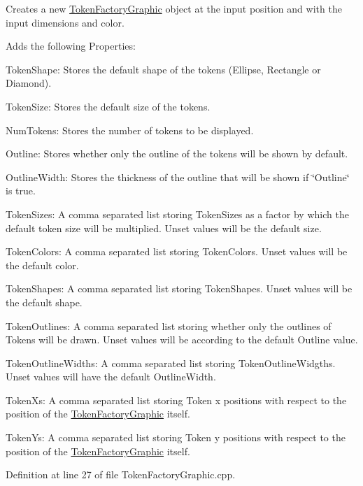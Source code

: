 Creates a new \hyperlink{class_picto_1_1_token_factory_graphic}{Token\-Factory\-Graphic} object at the input position and with the input dimensions and color. 

Adds the following Properties\-:
\begin{DoxyItemize}
\item Token\-Shape\-: Stores the default shape of the tokens (Ellipse, Rectangle or Diamond).
\item Token\-Size\-: Stores the default size of the tokens.
\item Num\-Tokens\-: Stores the number of tokens to be displayed.
\item Outline\-: Stores whether only the outline of the tokens will be shown by default.
\item Outline\-Width\-: Stores the thickness of the outline that will be shown if \char`\"{}\-Outline\char`\"{} is true.
\item Token\-Sizes\-: A comma separated list storing Token\-Sizes as a factor by which the default token size will be multiplied. Unset values will be the default size.
\item Token\-Colors\-: A comma separated list storing Token\-Colors. Unset values will be the default color.
\item Token\-Shapes\-: A comma separated list storing Token\-Shapes. Unset values will be the default shape.
\item Token\-Outlines\-: A comma separated list storing whether only the outlines of Tokens will be drawn. Unset values will be according to the default Outline value.
\item Token\-Outline\-Widths\-: A comma separated list storing Token\-Outline\-Widgths. Unset values will have the default Outline\-Width.
\item Token\-Xs\-: A comma separated list storing Token x positions with respect to the position of the \hyperlink{class_picto_1_1_token_factory_graphic}{Token\-Factory\-Graphic} itself.
\item Token\-Ys\-: A comma separated list storing Token y positions with respect to the position of the \hyperlink{class_picto_1_1_token_factory_graphic}{Token\-Factory\-Graphic} itself. 
\end{DoxyItemize}

Definition at line 27 of file Token\-Factory\-Graphic.\-cpp.



